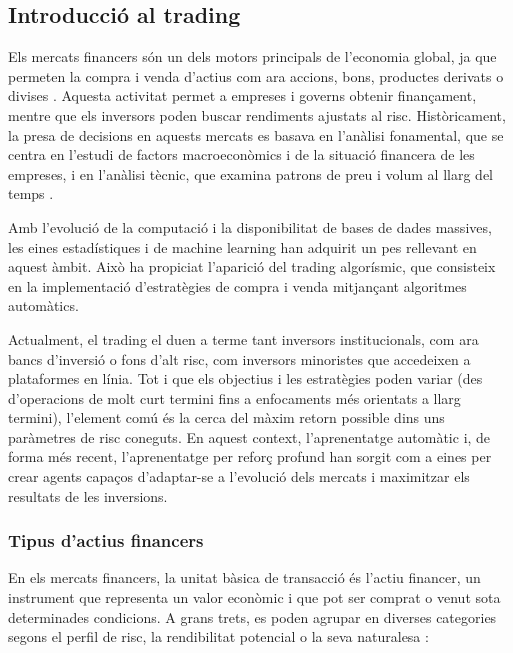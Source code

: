\documentclass[12pt,a4paper,twoside]{book}
\begin{document}
\subsection{Introducció al trading}
\sloppy

Els mercats financers són un dels motors principals de l'economia global, ja que permeten la compra i venda d'actius com ara accions, bons, productes derivats o divises \cite{InvestopediaFinance}. Aquesta activitat permet a empreses i governs obtenir finançament, mentre que els inversors poden buscar rendiments ajustats al risc. Històricament, la presa de decisions en aquests mercats es basava en l'anàlisi fonamental, que se centra en l'estudi de factors macroeconòmics i de la situació financera de les empreses, i en l'anàlisi tècnic, que examina patrons de preu i volum al llarg del temps \cite{TradersBook}.

Amb l'evolució de la computació i la disponibilitat de bases de dades massives, les eines estadístiques i de machine learning han adquirit un pes rellevant en aquest àmbit. Això ha propiciat l'aparició del trading algorísmic, que consisteix en la implementació d'estratègies de compra i venda mitjançant algoritmes automàtics.

Actualment, el trading el duen a terme tant inversors institucionals, com ara bancs d'inversió o fons d'alt risc, com inversors minoristes que accedeixen a plataformes en línia. Tot i que els objectius i les estratègies poden variar (des d'operacions de molt curt termini fins a enfocaments més orientats a llarg termini), l'element comú és la cerca del màxim retorn possible dins uns paràmetres de risc coneguts. En aquest context, l'aprenentatge automàtic i, de forma més recent, l'aprenentatge per reforç profund han sorgit com a eines per crear agents capaços d'adaptar-se a l'evolució dels mercats i maximitzar els resultats de les inversions.


\subsubsection{Tipus d'actius financers}
En els mercats financers, la unitat bàsica de transacció és l'actiu financer, un instrument que representa un valor econòmic i que pot ser comprat o venut sota determinades condicions. A grans trets, es poden agrupar en diverses categories segons el perfil de risc, la rendibilitat potencial o la seva naturalesa \cite{TypesOfInv}:
\end{document}
